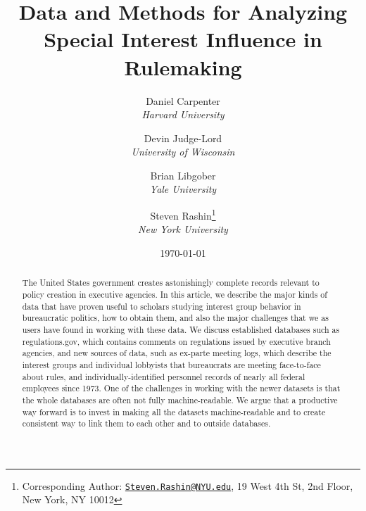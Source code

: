 \documentclass[12pt,notitlepage]{article}
\title{Data and Methods for Analyzing Special Interest Influence in Rulemaking}
\author{ %
            Daniel Carpenter  \\ \emph{Harvard University} 
             \and 
            Devin Judge-Lord  \\ \emph{University of Wisconsin} 
             \and 
            Brian Libgober  \\ \emph{Yale University} 
             \and 
            Steven Rashin\footnote{Corresponding Author:
\href{mailto:Steven.Rashin@NYU.edu}{\nolinkurl{Steven.Rashin@NYU.edu}},
19 West 4th St, 2nd Floor, New York, NY 10012}  \\ \emph{New York University} 
            }
\date{\today}
\newcounter{cor}
\begin{document}
	


	
	\maketitle
	
	\singlespacing
	\begin{abstract}
	The United States government creates astonishingly complete records
relevant to policy creation in executive agencies. In this article, we
describe the major kinds of data that have proven useful to scholars
studying interest group behavior in bureaucratic politics, how to obtain
them, and also the major challenges that we as users have found in
working with these data. We discuss established databases such as
regulations.gov, which contains comments on regulations issued by
executive branch agencies, and new sources of data, such as ex-parte
meeting logs, which describe the interest groups and individual
lobbyists that bureaucrats are meeting face-to-face about rules, and
individually-identified personnel records of nearly all federal
employees since 1973. One of the challenges in working with the newer
datasets is that the whole databases are often not fully
machine-readable. We argue that a productive way forward is to invest in
making all the datasets machine-readable and to create consistent way to
link them to each other and to outside databases.
	\end{abstract} \hspace{10pt}
	
\end{document}
